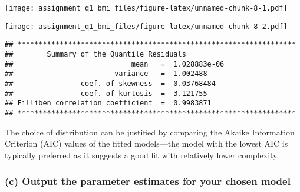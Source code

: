 \begin{Shaded}
\begin{Highlighting}[]
\OtherTok{\textless{}{-}}\NormalTok{ models[[}\NormalTok{(aic\_values)]]}
\OtherTok{\textless{}{-}} \SpecialCharTok{$}\NormalTok{, }\NormalTok{, }\NormalTok{(}\NormalTok{,}\NormalTok{), }\NormalTok{(}\NormalTok{,}\NormalTok{))}
\end{Highlighting}
\end{Shaded}

\texttt{[image: assignment\_q1\_bmi\_files/figure-latex/unnamed-chunk-8-1.pdf]}

\begin{Shaded}
\begin{Highlighting}[]
\end{Highlighting}
\end{Shaded}

\texttt{[image: assignment\_q1\_bmi\_files/figure-latex/unnamed-chunk-8-2.pdf]}

\begin{verbatim}
## ******************************************************************
##        Summary of the Quantile Residuals
##                            mean   =  1.028883e-06 
##                        variance   =  1.002488 
##                coef. of skewness  =  0.03768484 
##                coef. of kurtosis  =  3.121755 
## Filliben correlation coefficient  =  0.9983871 
## ******************************************************************
\end{verbatim}

The choice of distribution can be justified by comparing the Akaike
Information Criterion (AIC) values of the fitted models---the model with
the lowest AIC is typically preferred as it suggests a good fit with
relatively lower complexity.

\hypertarget{c-output-the-parameter-estimates-for-your-chosen-model}{%
\subsubsection{(c) Output the parameter estimates for your chosen
model}\label{c-output-the-parameter-estimates-for-your-chosen-model}}

